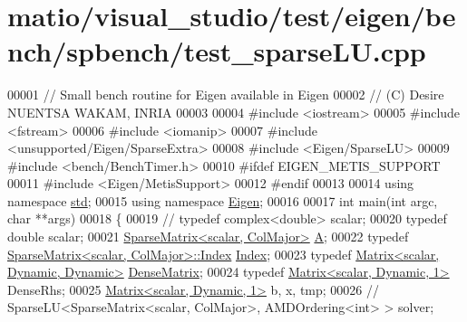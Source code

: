 \hypertarget{matio_2visual__studio_2test_2eigen_2bench_2spbench_2test__sparse_l_u_8cpp_source}{}\section{matio/visual\+\_\+studio/test/eigen/bench/spbench/test\+\_\+sparse\+LU.cpp}
\label{matio_2visual__studio_2test_2eigen_2bench_2spbench_2test__sparse_l_u_8cpp_source}

\begin{DoxyCode}
00001 \textcolor{comment}{// Small bench routine for Eigen available in Eigen}
00002 \textcolor{comment}{// (C) Desire NUENTSA WAKAM, INRIA}
00003 
00004 \textcolor{preprocessor}{#include <iostream>}
00005 \textcolor{preprocessor}{#include <fstream>}
00006 \textcolor{preprocessor}{#include <iomanip>}
00007 \textcolor{preprocessor}{#include <unsupported/Eigen/SparseExtra>}
00008 \textcolor{preprocessor}{#include <Eigen/SparseLU>}
00009 \textcolor{preprocessor}{#include <bench/BenchTimer.h>}
00010 \textcolor{preprocessor}{#ifdef EIGEN\_METIS\_SUPPORT}
00011 \textcolor{preprocessor}{#include <Eigen/MetisSupport>}
00012 \textcolor{preprocessor}{#endif}
00013 
00014 \textcolor{keyword}{using namespace }\hyperlink{namespacestd}{std};
00015 \textcolor{keyword}{using namespace }\hyperlink{namespace_eigen}{Eigen};
00016 
00017 \textcolor{keywordtype}{int} main(\textcolor{keywordtype}{int} argc, \textcolor{keywordtype}{char} **args)
00018 \{
00019 \textcolor{comment}{//   typedef complex<double> scalar; }
00020   \textcolor{keyword}{typedef} \textcolor{keywordtype}{double} scalar; 
00021   \hyperlink{group___sparse_core___module_class_eigen_1_1_sparse_matrix}{SparseMatrix<scalar, ColMajor>} \hyperlink{group___core___module_class_eigen_1_1_matrix}{A}; 
00022   \textcolor{keyword}{typedef} \hyperlink{group___sparse_core___module_class_eigen_1_1_sparse_matrix}{SparseMatrix<scalar, ColMajor>::Index} 
      \hyperlink{namespace_eigen_a62e77e0933482dafde8fe197d9a2cfde}{Index};
00023   \textcolor{keyword}{typedef} \hyperlink{group___core___module_class_eigen_1_1_matrix}{Matrix<scalar, Dynamic, Dynamic>} 
      \hyperlink{group___core___module}{DenseMatrix};
00024   \textcolor{keyword}{typedef} \hyperlink{group___core___module_class_eigen_1_1_matrix}{Matrix<scalar, Dynamic, 1>} DenseRhs;
00025   \hyperlink{group___core___module_class_eigen_1_1_matrix}{Matrix<scalar, Dynamic, 1>} b, x, tmp;
00026 \textcolor{comment}{//   SparseLU<SparseMatrix<scalar, ColMajor>, AMDOrdering<int> >   solver;}

\end{DoxyCode}
